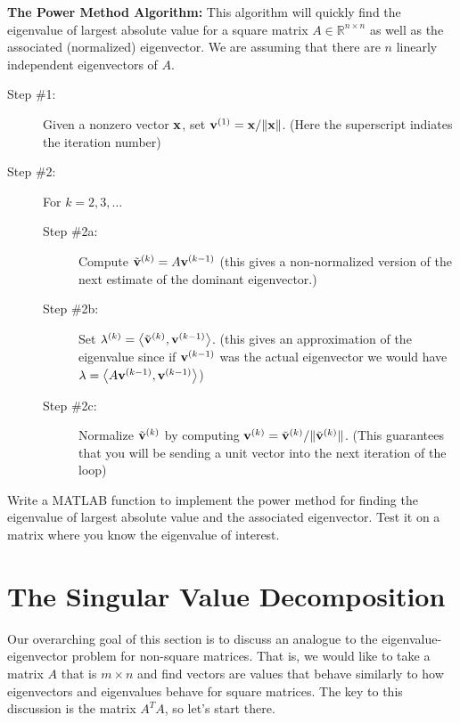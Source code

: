 \begin{problem}
    {\bf The Power Method Algorithm:} This algorithm will quickly find the 
    eigenvalue of largest absolute value for a square matrix $A \in \mathbb{R}^{n \times
    n}$ as well as the associated (normalized) eigenvector.  We are
    assuming that there are $n$ linearly independent eigenvectors of $A$.
    \begin{description}
        \item[Step \#1:] Given a nonzero vector ${\bf x}$, set ${\bf v}^{(1)} = {\bf x} / \|{\bf x}\|$.
            (Here the superscript indiates the iteration number)
        \item[Step \#2:] For $k=2, 3, \ldots$
            \begin{description}
                \item[Step \#2a:] Compute $\tilde{{\bf v}}^{(k)} = A {\bf v}^{(k-1)}$ (this gives
                    a non-normalized version of the next estimate of the dominant
                    eigenvector.)
                \item[Step \#2b:] Set $\lambda^{(k)} = \left< \tilde{{\bf v}}^{(k)} ,
                    {\bf v}^{(k-1)} \right>$.  (this gives an approximation of the eigenvalue
                    since if ${\bf v}^{(k-1)}$ was the actual eigenvector we would have
                    $\lambda = \left< A {\bf v}^{(k-1)}, {\bf v}^{(k-1)} \right>$)
                \item[Step \#2c:] Normalize $\tilde{{\bf v}}^{(k)}$ by computing ${\bf v}^{(k)} =
                    \tilde{{\bf v}}^{(k)} / \| \tilde{{\bf v}}^{(k)} \|$. (This guarantees that
                    you will be sending a unit vector into the next iteration of the loop)
            \end{description}
    \end{description}
\end{problem}

\begin{problem}
    Write a MATLAB function to implement the power method for finding the eigenvalue of
    largest absolute value and the associated eigenvector.  Test it on a matrix where you
    know the eigenvalue of interest.
\end{problem}


\section{The Singular Value Decomposition}
Our overarching goal of this section is to discuss an analogue to the
eigenvalue-eigenvector problem for non-square matrices.  That is, we would like to take a
matrix $A$ that is $m \times n$ and find vectors are values that behave similarly to how
eigenvectors and eigenvalues behave for square matrices.  The key to this discussion is
the matrix $A^T A$, so let's start there.

